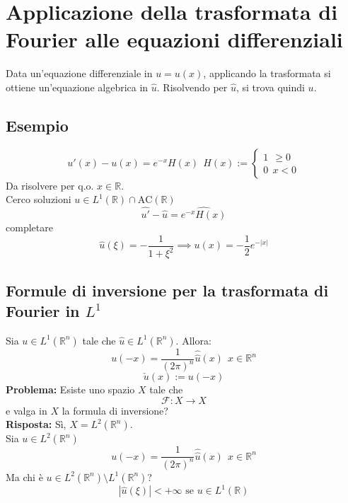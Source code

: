 \documentclass[a4paper]{article}
\newcommand{\R}{\mathbb{R}}
\begin{document}
\section{Applicazione della trasformata di Fourier alle equazioni differenziali}
Data un'equazione differenziale in $u=u(x)$, applicando la trasformata si ottiene un'equazione algebrica in $\hat{u}$. Risolvendo per $\hat{u}$, si trova quindi $u$.
\subsection{Esempio} 
\[u'(x)-u(x)=e^{-x}H(x)\ \ H(x):=\begin{cases}
	1\ \ \ge 0\\
	0\ \ x<0
\end{cases}\]
Da risolvere per q.o. $x\in \R$.
\\Cerco soluzioni $u\in L^{1}(\R)\cap\text{AC}(\R)$ 
\[\hat{u'}-\hat{u}= \widehat{e^{-x}H(x)}\]
completare
\[\hat{u}(\xi)=-\frac{1}{1+\xi^2}\implies u(x)=-\frac{1}{2}e^{-|x|}\]
\subsection{Formule di inversione per la trasformata di Fourier in $L^1$ }
Sia $u\in L^{1}(\R^n)$ tale che $\hat{u}\in L^{1}(\R^n)$. Allora:
\[u(-x)=\frac{1}{(2\pi)^n}\hat{\hat{u}}(x)\ \ x\in \R^n\]
\[\check{u}(x):=u(-x)\]
\textbf{Problema:} Esiste uno spazio $X$ tale che 
\[\mathcal F:X\to X\]
e valga in $X$ la formula di inversione?
\\\textbf{Risposta:} Sì, $X=L^{2}(\R^n)$.
\\Sia $u\in L^{2}(\R^n)$ 
\[u(-x)=\frac{1}{(2\pi)^n}\hat{\hat{u}}(x)\ \ x\in \R^n\]
Ma chi è $u\in L^{2}(\R^n)\setminus L^{1}(\R^n)$?
\[|\hat{u}(\xi)|<+\infty\text{ se }u\in L^{1}(\R)\]
\end{document}
